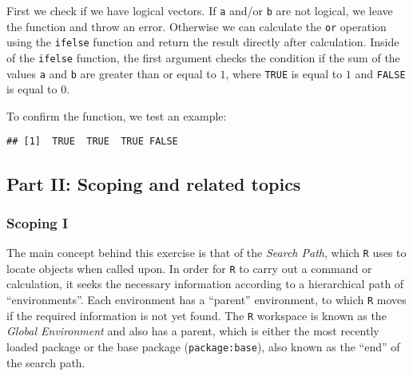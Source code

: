 \documentclass[11,]{article}
\newenvironment{Shaded}{\begin{snugshade}}{\end{snugshade}}
\newcommand{\KeywordTok}[1]{\textcolor[rgb]{0.13,0.29,0.53}{\textbf{{#1}}}}
\newcommand{\StringTok}[1]{\textcolor[rgb]{0.31,0.60,0.02}{{#1}}}
\newcommand{\OtherTok}[1]{\textcolor[rgb]{0.56,0.35,0.01}{{#1}}}
\newcommand{\NormalTok}[1]{{#1}}
\begin{document}
First we check if we have logical vectors. If \texttt{a} and/or
\texttt{b} are not logical, we leave the function and throw an error.
Otherwise we can calculate the \texttt{or} operation using the
\texttt{ifelse} function and return the result directly after
calculation. Inside of the \texttt{ifelse} function, the first argument
checks the condition if the sum of the values \texttt{a} and \texttt{b}
are greater than or equal to \(1\), where \texttt{TRUE} is equal to
\(1\) and \texttt{FALSE} is equal to \(0\).

To confirm the function, we test an example:

\begin{Shaded}
\end{Shaded}

\begin{verbatim}
## [1]  TRUE  TRUE  TRUE FALSE
\end{verbatim}

\subsection{Part II: Scoping and related
topics}\label{part-ii-scoping-and-related-topics}

\subsubsection{Scoping I}\label{scoping-i}

The main concept behind this exercise is that of the \emph{Search Path},
which \texttt{R} uses to locate objects when called upon. In order for
\texttt{R} to carry out a command or calculation, it seeks the necessary
information according to a hierarchical path of ``environments''. Each
environment has a ``parent'' environment, to which \texttt{R} moves if
the required information is not yet found. The \texttt{R} workspace is
known as the \emph{Global Environment} and also has a parent, which is
either the most recently loaded package or the base package
(\texttt{package:base}), also known as the ``end'' of the search path.
\end{document}
